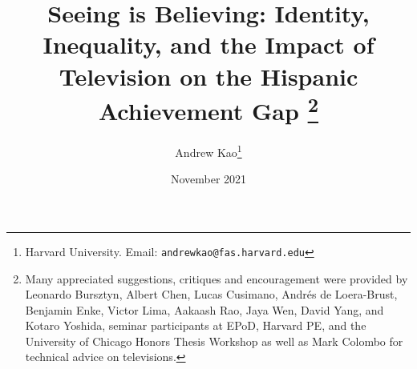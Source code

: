 \documentclass[11pt]{article}
\begin{document}
\title{\textbf{Seeing is Believing: Identity, Inequality, and the Impact of Television on the Hispanic Achievement Gap}%
\thanks{Many appreciated suggestions, critiques and encouragement were provided by Leonardo Bursztyn, Albert Chen, Lucas Cusimano, Andrés de Loera-Brust, Benjamin Enke, Victor Lima, Aakaash Rao, Jaya Wen, David Yang, and Kotaro Yoshida, seminar participants at EPoD, Harvard PE, and the University of Chicago Honors Thesis Workshop as well as Mark Colombo for technical advice on televisions. }\\
}



\author{Andrew Kao\thanks{Harvard University. Email: \texttt{andrewkao@fas.harvard.edu}} }

\date{November 2021}
{\vspace{-5ex}}


\maketitle
\end{document}

